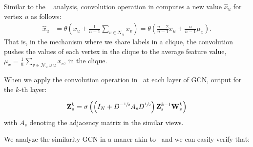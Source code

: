 Similar to the ~ analysis, convolution operation in  computes a new value $\hat{x}_u$ for vertex $u$ as follows:
\begin{align}
  \hat{x}_u &= \theta \left ( x_u + \frac{1}{n-1} \sum_{v \in \mathcal{N}_u} x_v \right ) = \theta \left ( \frac{n-2}{n-1} x_u + \frac{n}{n-1} \mu_x \right ).
\end{align}
That is, in the mechanism where we share labels in a clique, the convolution pushes the values of each vertex in the clique to the average feature value, $\mu_x = \frac{1}{n} \sum_{v \in \mathcal{N}_u \cup u} x_v$, in the clique.

When we apply the convolution operation in~ at each layer of GCN, output for the $k$-th layer:

\begin{equation}
  \label{eq:similar}
  \mathbf{Z}_s^{k} = \sigma \left( \left (I_N + D^{-\sfrac{1}{2}}A_sD^{\sfrac{1}{2}} \right) \mathbf{Z}_s^{k-1} \mathbf{W}_s^{k}\right)
\end{equation}
with $A_s$ denoting the adjacency matrix in the similar views.

We analyze the similarity GCN in a maner akin to~ and
we can easily verify that:

